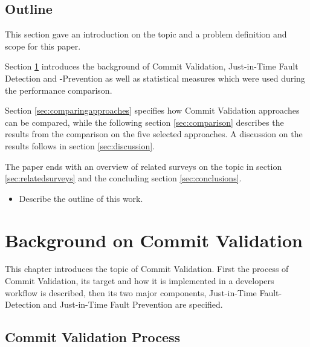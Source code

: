 \subsection{Outline}
This section gave an introduction on the topic and a problem definition and scope for this paper.

Section \ref{sec:background} introduces the background of Commit Validation, Just-in-Time Fault Detection and -Prevention as well as statistical measures which were used during the performance comparison.

Section \ref{sec:comparingapproaches} specifies how Commit Validation approaches can be compared, while the following section \ref{sec:comparison} describes the results from the comparison on the five selected approaches. A discussion on the results follows in section \ref{sec:discussion}.

The paper ends with an overview of related surveys on the topic in section \ref{sec:relatedsurveys} and the concluding section \ref{sec:conclusions}.


\begin{itemize}
	\item Describe the outline of this work.
\end{itemize}


\section{Background on Commit Validation}
\label{sec:background}

This chapter introduces the topic of Commit Validation. First the process of Commit Validation, its target and how it is implemented in a developers workflow is described, then its two major components, Just-in-Time Fault-Detection and Just-in-Time Fault Prevention are specified. 

\subsection{Commit Validation Process}
\label{sec:cvprocess}


